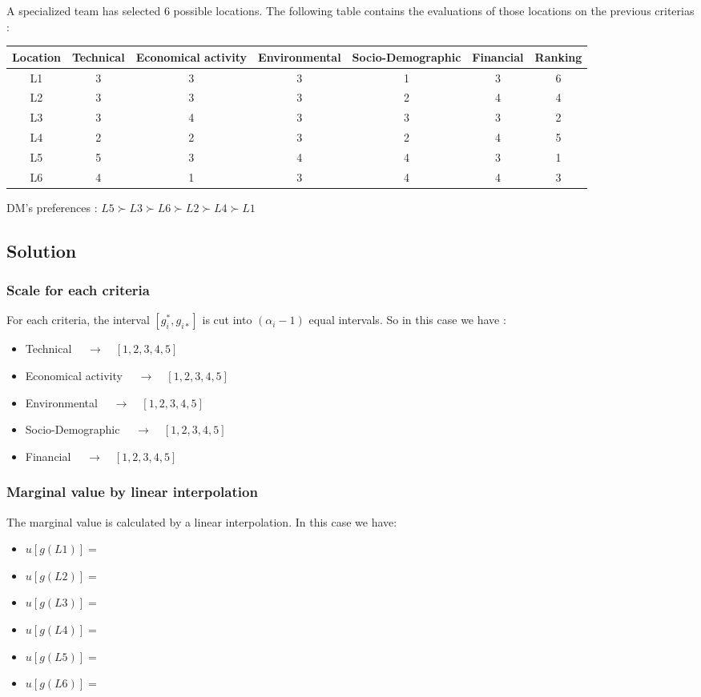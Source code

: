 \documentclass{report}
\begin{document}
A specialized team has selected 6 possible locations. The following table contains the evaluations of those locations on the previous criterias :
\begin{center}
\begin{tabular}{ |c|c|c|c|c|c|c| } 
\hline
Location & Technical & Economical activity & Environmental & Socio-Demographic & Financial & Ranking \\
\hline
L1 & 3 & 3 & 3 & 1 & 3 & 6 \\
L2 & 3 & 3 & 3 & 2 & 4 & 4 \\
L3  & 3 & 4 & 3 & 3 & 3 & 2 \\
L4 & 2 & 2 & 3 & 2 & 4 & 5 \\
L5 & 5 & 3 & 4 & 4 & 3 & 1 \\
L6 & 4 & 1 & 3 & 4 & 4 & 3 \\
\hline
\end{tabular}
\end{center}

DM's preferences : $ L5 \succ L3\succ L6\succ L2 \succ L4 \succ L1$\\

\newpage
\subsection{Solution}
\subsubsection{Scale for each criteria}
For each criteria, the interval $[g_i^{*}, g_{i*}]$ is cut into $(\alpha _i -1)$ equal intervals. So in this case we have : 
\begin{itemize}
\item Technical  $\quad \rightarrow \quad [1, 2, 3, 4, 5]$
\item Economical activity   $\quad \rightarrow \quad [1, 2, 3, 4, 5]$
\item Environmental  $\quad \rightarrow \quad [1, 2, 3, 4, 5]$
\item Socio-Demographic  $\quad \rightarrow \quad [1, 2, 3, 4, 5]$
\item Financial  $\quad \rightarrow \quad [1, 2, 3, 4, 5]$
\end{itemize}

\subsubsection{Marginal value by linear interpolation}
The marginal value is calculated by a linear interpolation. In this case we have: 
\begin{itemize}
\item $u[g(L1)]= $
\item $u[g(L2)]= $
\item $u[g(L3)]= $
\item $u[g(L4)]= $
\item $u[g(L5)]= $
\item $u[g(L6)]= $
\end{itemize}
\end{document}
